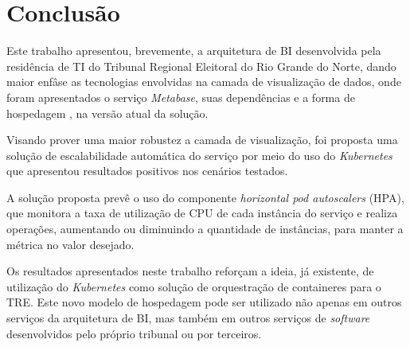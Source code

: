 \section{Conclusão}

Este trabalho apresentou, brevemente, a arquitetura de BI desenvolvida pela residência de TI do Tribunal Regional Eleitoral do Rio Grande do Norte, dando maior enfâse as tecnologias envolvidas na camada de visualização de dados, onde foram apresentados o serviço \textit{Metabase}, suas dependências e a forma de hospedagem , na versão atual da solução.

Visando prover uma maior robustez a camada de visualização, foi proposta uma solução de escalabilidade automática do serviço por meio do uso do \textit{Kubernetes} que apresentou resultados positivos nos cenários testados. 

A solução proposta prevê o uso do componente \textit{horizontal pod autoscalers} (HPA), que monitora a taxa de utilização de CPU de cada instância do serviço e realiza operações, aumentando ou diminuindo a quantidade de instâncias, para manter a métrica no valor desejado.

Os resultados apresentados neste trabalho reforçam a ideia, já existente, de utilização do \textit{Kubernetes} como solução de orquestração de containeres para o TRE. Este novo modelo de hospedagem pode ser utilizado não apenas em outros serviços da arquitetura de BI, mas também em outros serviços de \textit{software} desenvolvidos pelo próprio tribunal ou por terceiros. 
